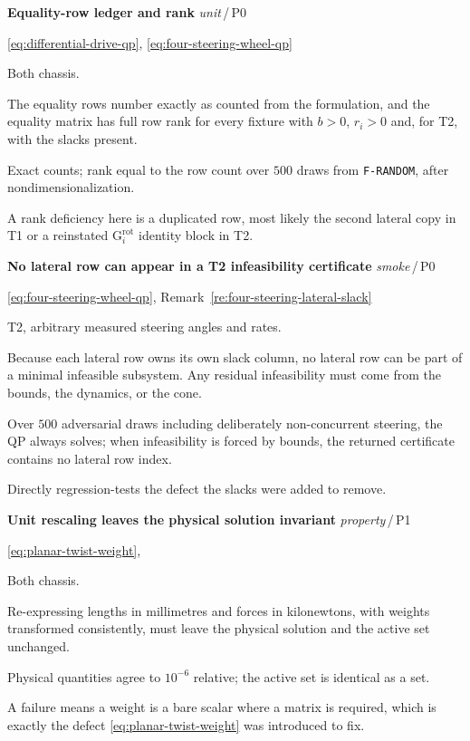 \documentclass[10pt]{article}
\newcommand{\wheelRadius}{r}
\newenvironment{testcard}[4]{%
  \par\medskip\noindent
  \tBlock{#1}\quad\textbf{#2}%
  \hfill{\small\textit{#3}\,/\,#4}\par\nopagebreak\vspace{2pt}
  \begin{description}[leftmargin=7.5em,style=sameline,itemsep=1pt,topsep=1pt]
}{%
  \end{description}\par\medskip
}
\begin{document}
\begin{testcard}{QP-04}{Equality-row ledger and rank}{unit}{P0}
  \item[Targets] \eqref{eq:differential-drive-qp},
    \eqref{eq:four-steering-wheel-qp}
  \item[Regime] Both chassis.
  \item[Invariant] The equality rows number exactly as counted from the
    formulation, and the equality matrix has full row rank for every fixture
    with $b>0$, $\wheelRadius_i>0$ and, for T2, with the slacks present.
  \item[Pass] Exact counts; rank equal to the row count over $500$ draws from
    \texttt{F-RANDOM}, after nondimensionalization.
  \item[Diagnosis] A rank deficiency here is a duplicated row, most likely the
    second lateral copy in T1 or a reinstated $\text{G}^{\text{rot}}_i$
    identity block in T2.
\end{testcard}

\begin{testcard}{QP-05}{No lateral row can appear in a T2 infeasibility certificate}{smoke}{P0}
  \item[Targets] \eqref{eq:four-steering-wheel-qp},
    Remark~\ref{re:four-steering-lateral-slack}
  \item[Regime] T2, arbitrary measured steering angles and rates.
  \item[Invariant] Because each lateral row owns its own slack column, no
    lateral row can be part of a minimal infeasible subsystem. Any residual
    infeasibility must come from the bounds, the dynamics, or the cone.
  \item[Pass] Over $500$ adversarial draws including deliberately
    non-concurrent steering, the QP always solves; when infeasibility is forced
    by bounds, the returned certificate contains no lateral row index.
  \item[Diagnosis] Directly regression-tests the defect the slacks were added
    to remove.
\end{testcard}

\begin{testcard}{QP-06}{Unit rescaling leaves the physical solution invariant}{property}{P1}
  \item[Targets] \eqref{eq:planar-twist-weight},
  \item[Regime] Both chassis.
  \item[Invariant] Re-expressing lengths in millimetres and forces in
    kilonewtons, with weights transformed consistently, must leave the physical
    solution and the active set unchanged.
  \item[Pass] Physical quantities agree to $10^{-6}$ relative; the active set is
    identical as a set.
  \item[Diagnosis] A failure means a weight is a bare scalar where a matrix is
    required, which is exactly the defect
    \eqref{eq:planar-twist-weight} was introduced to fix.
\end{testcard}
\end{document}
